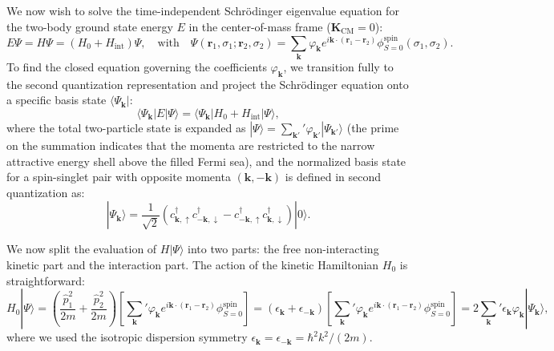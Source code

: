We now wish to solve the time-independent Schrödinger eigenvalue equation for the two-body ground state energy \( E \) in the center-of-mass frame (\( \mathbf{K}_{\text{CM}} = 0 \)):
\[
    E \Psi = H \Psi = (H_0 + H_{\text{int}}) \Psi, \quad \text{with} \quad \Psi(\mathbf{r}_1, \sigma_1; \mathbf{r}_2, \sigma_2) = \sum_{\mathbf{k}} \varphi_{\mathbf{k}} e^{i\mathbf{k} \cdot (\mathbf{r}_1 - \mathbf{r}_2)} \phi_{S=0}^{\text{spin}}(\sigma_1, \sigma_2).
\]
To find the closed equation governing the coefficients \( \varphi_{\mathbf{k}} \), we transition fully to the second quantization representation and project the Schrödinger equation onto a specific basis state \( \langle \Psi_{\mathbf{k}} | \):
\[
    \langle \Psi_{\mathbf{k}} | E | \Psi \rangle = \langle \Psi_{\mathbf{k}} | H_0 + H_{\text{int}} | \Psi \rangle,
\]
where the total two-particle state is expanded as \( |\Psi\rangle = \sum_{\mathbf{k}'}' \varphi_{\mathbf{k}'} |\Psi_{\mathbf{k}'}\rangle \) (the prime on the summation indicates that the momenta are restricted to the narrow attractive energy shell above the filled Fermi sea), and the normalized basis state for a spin-singlet pair with opposite momenta \( (\mathbf{k}, -\mathbf{k}) \) is defined in second quantization as:
\begin{equation} \label{eq:singlet_basis_state}
    |\Psi_{\mathbf{k}}\rangle = \frac{1}{\sqrt{2}} \left( c_{\mathbf{k}, \uparrow}^\dagger c_{-\mathbf{k}, \downarrow}^\dagger - c_{-\mathbf{k}, \uparrow}^\dagger c_{\mathbf{k}, \downarrow}^\dagger \right) |0\rangle.
\end{equation}

We now split the evaluation of \( H |\Psi\rangle \) into two parts: the free non-interacting kinetic part and the interaction part. The action of the kinetic Hamiltonian \( H_0 \) is straightforward:
\[
    H_0 |\Psi\rangle = \left( \frac{\hat{p}_1^2}{2m} + \frac{\hat{p}_2^2}{2m} \right) \left[ \sum_{\mathbf{k}}' \varphi_{\mathbf{k}} e^{i\mathbf{k} \cdot (\mathbf{r}_1 - \mathbf{r}_2)} \phi_{S=0}^{\text{spin}} \right] = (\epsilon_{\mathbf{k}} + \epsilon_{-\mathbf{k}}) \left[ \sum_{\mathbf{k}}' \varphi_{\mathbf{k}} e^{i\mathbf{k} \cdot (\mathbf{r}_1 - \mathbf{r}_2)} \phi_{S=0}^{\text{spin}} \right] = 2 \sum_{\mathbf{k}}' \epsilon_{\mathbf{k}} \varphi_{\mathbf{k}} |\Psi_{\mathbf{k}}\rangle,
\]
where we used the isotropic dispersion symmetry \( \epsilon_{\mathbf{k}} = \epsilon_{-\mathbf{k}} = \hbar^2 k^2 / (2m) \).

